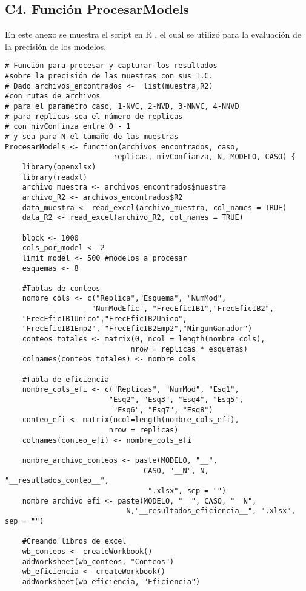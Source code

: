 \newpage
\subsection*{C4. Función ProcesarModels}

En este anexo se muestra el script en R \parencite{R-2024}, el cual se utilizó para la evaluación de la precisión de los modelos.\\

\begin{verbatim}
# Función para procesar y capturar los resultados 
#sobre la precisión de las muestras con sus I.C.
# Dado archivos_encontrados <-  list(muestra,R2) 
#con rutas de archivos
# para el parametro caso, 1-NVC, 2-NVD, 3-NNVC, 4-NNVD
# para replicas sea el número de replicas
# con nivConfinza entre 0 - 1
# y sea para N el tamaño de las muestras
ProcesarModels <- function(archivos_encontrados, caso,
						 replicas, nivConfianza, N, MODELO, CASO) {
	library(openxlsx)
	library(readxl)
	archivo_muestra <- archivos_encontrados$muestra
	archivo_R2 <- archivos_encontrados$R2
	data_muestra <- read_excel(archivo_muestra, col_names = TRUE)
	data_R2 <- read_excel(archivo_R2, col_names = TRUE)
	
	block <- 1000
	cols_por_model <- 2
	limit_model <- 500 #modelos a procesar
	esquemas <- 8
	
	#Tablas de conteos
	nombre_cols <- c("Replica","Esquema", "NumMod", 
					"NumModEfic", "FrecEficIB1","FrecEficIB2",
	"FrecEficIB1Unico","FrecEficIB2Unico",
	"FrecEficIB1Emp2", "FrecEficIB2Emp2","NingunGanador")
	conteos_totales <- matrix(0, ncol = length(nombre_cols),
							 nrow = replicas * esquemas)
	colnames(conteos_totales) <- nombre_cols
	
	#Tabla de eficiencia
	nombre_cols_efi <- c("Replicas", "NumMod", "Esq1", 
						"Esq2", "Esq3", "Esq4", "Esq5",
						 "Esq6", "Esq7", "Esq8")
	conteo_efi <- matrix(ncol=length(nombre_cols_efi),
						nrow = replicas)
	colnames(conteo_efi) <- nombre_cols_efi
	
	nombre_archivo_conteos <- paste(MODELO, "__", 
								CASO, "__N", N, "__resultados_conteo__",
								 ".xlsx", sep = "")
	nombre_archivo_efi <- paste(MODELO, "__", CASO, "__N", 
							N,"__resultados_eficiencia__", ".xlsx", sep = "")
	
	#Creando libros de excel
	wb_conteos <- createWorkbook()
	addWorksheet(wb_conteos, "Conteos")
	wb_eficiencia <- createWorkbook()
	addWorksheet(wb_eficiencia, "Eficiencia")
	

\end{verbatim}
